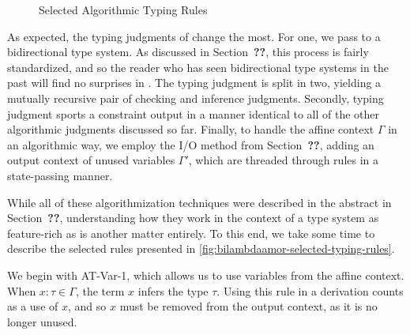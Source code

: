 \begin{figure}

\caption{Selected Algorithmic Typing Rules}
\label{fig:bilambdaamor-selected-typing-rules}
\end{figure}

As expected, the typing judgments of \bilambdaamor change the most. For one, we pass to a bidirectional type system. As discussed in Section~\textbf{??}, this process is fairly standardized, and so the reader who has seen bidirectional type systems in the past will find no surprises in \bilambdaamor. The typing judgment is split in two, yielding a mutually recursive pair of checking and inference judgments. Secondly, typing judgment sports a constraint output in a manner identical to all of the other algorithmic judgments discussed so far. Finally, to handle the affine context $\Gamma$ in an algorithmic way, we employ the I/O method from Section~\textbf{??}, adding an output context of unused variables $\Gamma'$, which are threaded through rules in a state-passing manner.

While all of these algorithmization techniques were described in the abstract in Section~\textbf{??}, understanding how they work in the context of a type system as feature-rich as \bilambdaamor is another matter entirely. To this end, we take some time to describe the selected rules presented in \autoref{fig:bilambdaamor-selected-typing-rules}.

We begin with AT-Var-1, which allows us to use variables from the affine context. When $x : \tau \in \Gamma$, the term $x$ infers the type $\tau$. Using this rule in a derivation counts as a use of $x$, and so $x$ must be removed from the output context, as it is no longer unused.

